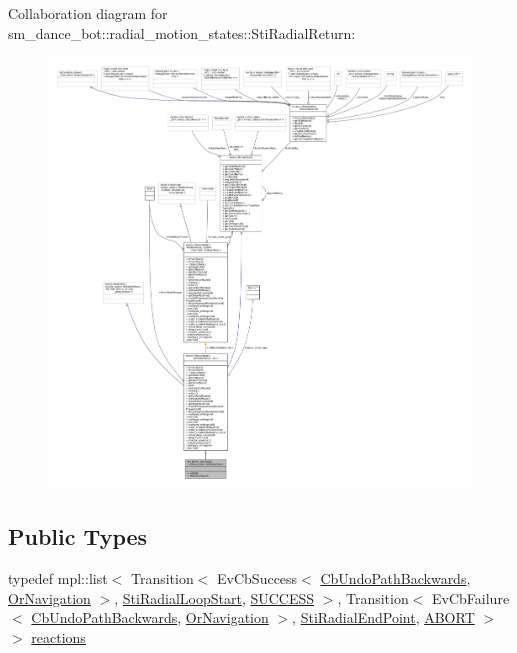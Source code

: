 Collaboration diagram for sm\+\_\+dance\+\_\+bot\+:\+:radial\+\_\+motion\+\_\+states\+:\+:Sti\+Radial\+Return\+:
\nopagebreak
\begin{figure}[H]
\begin{center}
\leavevmode
\includegraphics[width=350pt]{structsm__dance__bot_1_1radial__motion__states_1_1StiRadialReturn__coll__graph}
\end{center}
\end{figure}
\subsection*{Public Types}
\begin{DoxyCompactItemize}
\item 
typedef mpl\+::list$<$ Transition$<$ Ev\+Cb\+Success$<$ \hyperlink{classcl__move__base__z_1_1CbUndoPathBackwards}{Cb\+Undo\+Path\+Backwards}, \hyperlink{classsm__dance__bot_1_1OrNavigation}{Or\+Navigation} $>$, \hyperlink{structsm__dance__bot_1_1radial__motion__states_1_1StiRadialLoopStart}{Sti\+Radial\+Loop\+Start}, \hyperlink{structsmacc_1_1default__transition__tags_1_1SUCCESS}{S\+U\+C\+C\+E\+SS} $>$, Transition$<$ Ev\+Cb\+Failure$<$ \hyperlink{classcl__move__base__z_1_1CbUndoPathBackwards}{Cb\+Undo\+Path\+Backwards}, \hyperlink{classsm__dance__bot_1_1OrNavigation}{Or\+Navigation} $>$, \hyperlink{structsm__dance__bot_1_1radial__motion__states_1_1StiRadialEndPoint}{Sti\+Radial\+End\+Point}, \hyperlink{structsmacc_1_1default__transition__tags_1_1ABORT}{A\+B\+O\+RT} $>$ $>$ \hyperlink{structsm__dance__bot_1_1radial__motion__states_1_1StiRadialReturn_aa9de7333f73b75189f2693d4fa3f6d57}{reactions}
\end{DoxyCompactItemize}
